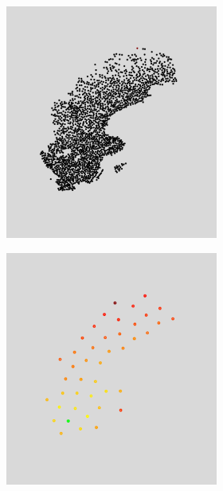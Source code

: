 \begin{figure}[H]
\begin{subfigure}[b]{1\linewidth}
\begin{subfigure}[t]{0.29\linewidth}
		\caption{} 
		\label{fig:bp5_1_sweden} 
		\vspace{4ex}
	\end{subfigure}
	\begin{subfigure}[t]{0.29\linewidth}
		\centering
		\includegraphics[width=0.9\linewidth]{Pictures/bp10_1_sweden}
		\caption{} 
		\label{fig:bp10_1_sweden} 
		\vspace{4ex}
	\end{subfigure}
\end{subfigure}
\begin{subfigure}[b]{1\linewidth}
	\centering
  \begin{subfigure}[b]{0.29\linewidth}
  	\centering
  	\includegraphics[width=0.9\linewidth]{Pictures/ls_10_sweden} 

\end{subfigure}
\end{subfigure}
\end{figure}
